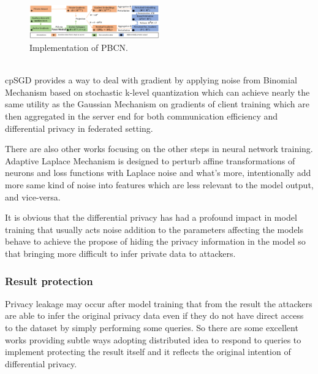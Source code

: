 \documentclass[conference]{IEEEtran}
\begin{document}
\begin{figure}[htbp]
    \centerline{\includegraphics[width=0.5\textwidth,height=0.15\textwidth]{GEP.png}}
    \caption{Implementation of PBCN.}
    \label{fig3}
\end{figure}\\
cpSGD\cite{b21} provides a way to deal with gradient by applying noise from Binomial Mechanism based on stochastic k-level quantization which can achieve nearly the same utility as the Gaussian Mechanism on gradients of client training which are then aggregated in the server end for both communication efficiency and differential privacy in federated setting.

There are also other works focusing on the other steps in neural network training. Adaptive Laplace Mechanism\cite{b22} is designed to perturb affine transformations of neurons and loss functions with Laplace noise and what's more, intentionally add more same kind of noise into features which are less relevant to the model output, and vice-versa.

It is obvious that the differential privacy has had a profound impact in model training that usually acts noise addition to the parameters affecting the models behave to achieve the propose of hiding the privacy information in the model so that bringing more difficult to infer private data to attackers.

\subsubsection{Result protection}
Privacy leakage may occur after model training that from the result the attackers are able to infer the original privacy data even if they do not have direct access to the dataset by simply performing some queries. So there are some excellent works providing subtle ways adopting distributed idea to respond to queries to implement protecting the result itself and it reflects the original intention of differential privacy.
\end{document}
